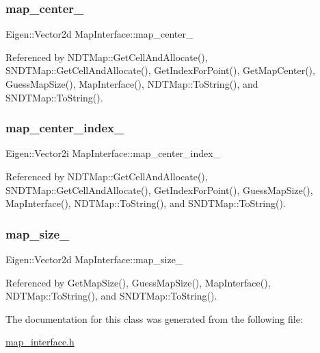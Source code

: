 \subsubsection{\texorpdfstring{map\+\_\+center\+\_\+}{map\_center\_}}
{\footnotesize\ttfamily Eigen\+::\+Vector2d Map\+Interface\+::map\+\_\+center\+\_\+\hspace{0.3cm}{\ttfamily [protected]}}



Referenced by N\+D\+T\+Map\+::\+Get\+Cell\+And\+Allocate(), S\+N\+D\+T\+Map\+::\+Get\+Cell\+And\+Allocate(), Get\+Index\+For\+Point(), Get\+Map\+Center(), Guess\+Map\+Size(), Map\+Interface(), N\+D\+T\+Map\+::\+To\+String(), and S\+N\+D\+T\+Map\+::\+To\+String().

\mbox{\label{classMapInterface_acbc97db0c3d7bd68b143d1a933a87439}} 
\subsubsection{\texorpdfstring{map\+\_\+center\+\_\+index\+\_\+}{map\_center\_index\_}}
{\footnotesize\ttfamily Eigen\+::\+Vector2i Map\+Interface\+::map\+\_\+center\+\_\+index\+\_\+\hspace{0.3cm}{\ttfamily [protected]}}



Referenced by N\+D\+T\+Map\+::\+Get\+Cell\+And\+Allocate(), S\+N\+D\+T\+Map\+::\+Get\+Cell\+And\+Allocate(), Get\+Index\+For\+Point(), Guess\+Map\+Size(), Map\+Interface(), N\+D\+T\+Map\+::\+To\+String(), and S\+N\+D\+T\+Map\+::\+To\+String().

\mbox{\label{classMapInterface_a83368917e03aaea6b1bcc4f8217426ef}} 
\subsubsection{\texorpdfstring{map\+\_\+size\+\_\+}{map\_size\_}}
{\footnotesize\ttfamily Eigen\+::\+Vector2d Map\+Interface\+::map\+\_\+size\+\_\+\hspace{0.3cm}{\ttfamily [protected]}}



Referenced by Get\+Map\+Size(), Guess\+Map\+Size(), Map\+Interface(), N\+D\+T\+Map\+::\+To\+String(), and S\+N\+D\+T\+Map\+::\+To\+String().



The documentation for this class was generated from the following file\+:\begin{DoxyCompactItemize}
\item 
\hyperlink{map__interface_8h}{map\+\_\+interface.\+h}\end{DoxyCompactItemize}

